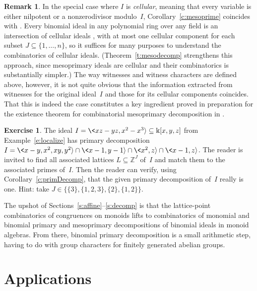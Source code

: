 \documentclass[12pt]{amsart}
\numberwithin{equation}{section}
\theoremstyle{definition}
\newtheorem{remark}[thm]{Remark}
\newtheorem{exercise}[thm]{Exercise}
\begin{document}
\begin{remark}
In the special case where $I$ is \emph{cellular}, meaning that every
variable is either nilpotent or a nonzerodivisor modulo~$I$,
Corollary~\ref{c:mesoprime} coincides with
\cite[Theorem~8.1]{binomialIdeals}.  Every binomial ideal in any
polynomial ring over any field is an intersection of cellular ideals
\cite[Theorem~6.2]{binomialIdeals}, with at most one cellular
component for each subset $J \subseteq \{1,\ldots,n\}$, so it suffices
for many purposes to understand the combinatorics of cellular ideals.
(Theorem~\ref{t:mesodecomp} strengthens this approach, since
mesoprimary ideals are cellular and their combinatorics is
substantially simpler.)  The way witnesses and witness characters are
defined above, however, it is not quite obvious that the information
extracted from witnesses for the original ideal~$I$ and those for its
cellular components coincides.  That this is indeed the case
constitutes a key ingredient proved in preparation for the existence
theorem for combinatorial mesoprimary decomposition in
\cite{mesoprimary}.
\end{remark}

\begin{exercise}
The ideal $I = \<xz-yz,x^2-x^3{\rangle} \subseteq {\Bbbk}[x,y,z]$ from
Example~\ref{e:localize} has primary decomposition $I =
\<x-y,x^2,xy,y^2{\rangle} \cap \<x-1,y-1{\rangle} \cap \<x^2, z{\rangle} \cap \<x-1, z{\rangle}$.
The reader is invited to find all associated lattices $L \subseteq
{\mathbb{Z}}^J$ of~$I$ and match them to the associated primes of~$I$.  Then
the reader can verify, using Corollary~\ref{c:primDecomp}, that the
given primary decomposition of~$I$ really is one.  Hint: take $J \in
\big\{\{3\}, \{1,2,3\}, \{2\}, \{1,2\}\big\}$.
\end{exercise}

The upshot of Sections~\ref{s:affine}--\ref{s:decomp} is that the
lattice-point combinatorics of congruences on monoids lifts to
combinatorics of monomial and binomial primary and mesoprimary
decompositions of binomial ideals in monoid algebras.  {}From there,
binomial primary decomposition is a small arithmetic step, having to
do with group characters for finitely generated abelian groups.

\part{Applications}\vspace{-1ex}
\end{document}
